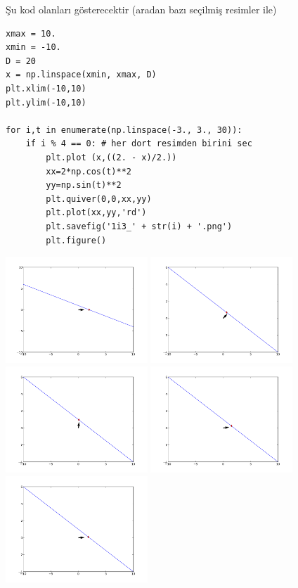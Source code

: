 \documentclass[12pt,fleqn]{article}\usepackage{../../common}
\begin{document}
Şu kod olanları gösterecektir (aradan bazı seçilmiş resimler ile)

\begin{verbatim}
xmax = 10.
xmin = -10.
D = 20
x = np.linspace(xmin, xmax, D)
plt.xlim(-10,10)
plt.ylim(-10,10)

for i,t in enumerate(np.linspace(-3., 3., 30)):
    if i % 4 == 0: # her dort resimden birini sec
        plt.plot (x,((2. - x)/2.))
        xx=2*np.cos(t)**2
        yy=np.sin(t)**2
        plt.quiver(0,0,xx,yy)
        plt.plot(xx,yy,'rd')
        plt.savefig('1i3_' + str(i) + '.png')
        plt.figure()
\end{verbatim}

\includegraphics[height=4cm]{1i3_0.png}
\includegraphics[height=4cm]{1i3_4.png}
\includegraphics[height=4cm]{1i3_8.png}
\includegraphics[height=4cm]{1i3_12.png}
\includegraphics[height=4cm]{1i3_16.png}
\end{document}
